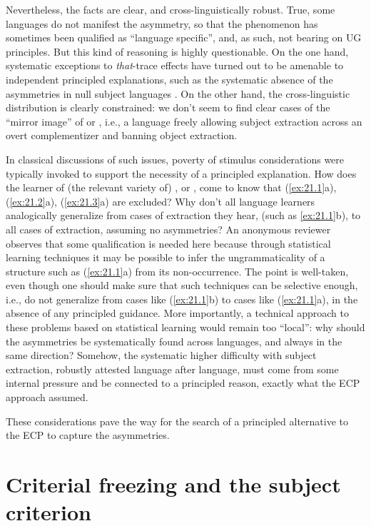 \documentclass[output=paper]{langsci/langscibook}
\begin{document}
Nevertheless, the facts are clear, and cross-linguistically robust. True, some
languages do not manifest the asymmetry, so that the phenomenon has sometimes
been qualified as “language specific”, and, as such, not bearing on
\gls{UG}
principles. But this kind of reasoning is highly questionable. On the one hand,
systematic exceptions to \emph{that}-trace effects have turned out to be
amenable to independent principled explanations, such as the systematic absence
of the asymmetries in null subject languages \citep{Rizzi:1982}. On the other
hand, the cross-linguistic distribution is clearly constrained: we don’t seem
to find clear cases of the “mirror image” of  or , i.e., a
language freely allowing subject extraction across an overt complementizer and
banning object extraction.

In classical discussions of such issues, poverty of stimulus considerations
were typically invoked to support the necessity of a principled explanation.
How does the learner of (the relevant variety of) , or ,
come to know that (\ref{ex:21.1}a), (\ref{ex:21.2}a),
(\ref{ex:21.3}a) are excluded? Why don’t all language learners analogically
generalize from cases of extraction they hear, (such as \ref{ex:21.1}b),
to all cases of extraction, assuming no asymmetries? An anonymous reviewer
observes that some qualification is needed here because through statistical
learning techniques it may be possible to infer the ungrammaticality of a
structure such as (\ref{ex:21.1}a) from its non-occurrence. The point is
well-taken, even though one should make sure that such techniques can be
selective enough, i.e., do not generalize from cases like (\ref{ex:21.1}b)
to cases like (\ref{ex:21.1}a), in the absence of any principled guidance.
More importantly, a  technical approach to these problems based on statistical
learning would remain too “local”:  why should the asymmetries be
systematically found across languages, and always in the same direction?
Somehow, the systematic higher difficulty with subject extraction, robustly
attested language after language, must come from some internal pressure and be
connected to a principled reason, exactly what the \gls{ECP} approach assumed.

These considerations pave the way for the search of a principled alternative to
the \gls{ECP} to capture the asymmetries.

\section{Criterial freezing and the subject criterion}
\end{document}
